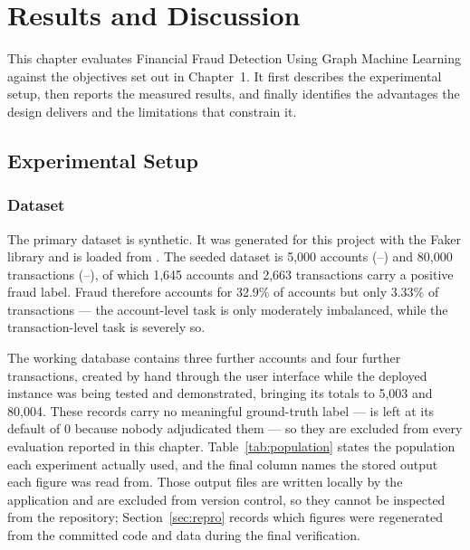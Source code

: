 \chapter{Results and Discussion}\label{ch:results}

This chapter evaluates Financial Fraud Detection Using Graph Machine Learning against the objectives set out in Chapter~1. It first describes the experimental setup, then reports the measured results, and finally identifies the advantages the design delivers and the limitations that constrain it.

\section{Experimental Setup}

\subsection{Dataset}\label{sec:dataset}
The primary dataset is synthetic. It was generated for this project with the Faker library and is loaded from . The seeded dataset is 5,000 accounts (--) and 80,000 transactions (--), of which 1,645 accounts and 2,663 transactions carry a positive fraud label. Fraud therefore accounts for 32.9\% of accounts but only 3.33\% of transactions --- the account-level task is only moderately imbalanced, while the transaction-level task is severely so.

The working database contains three further accounts and four further transactions, created by hand through the user interface while the deployed instance was being tested and demonstrated, bringing its totals to 5,003 and 80,004. These records carry no meaningful ground-truth label ---  is left at its default of 0 because nobody adjudicated them --- so they are excluded from every evaluation reported in this chapter. Table~\ref{tab:population} states the population each experiment actually used, and the final column names the stored output each figure was read from. Those output files are written locally by the application and are excluded from version control, so they cannot be inspected from the repository; Section~\ref{sec:repro} records which figures were regenerated from the committed code and data during the final verification.

